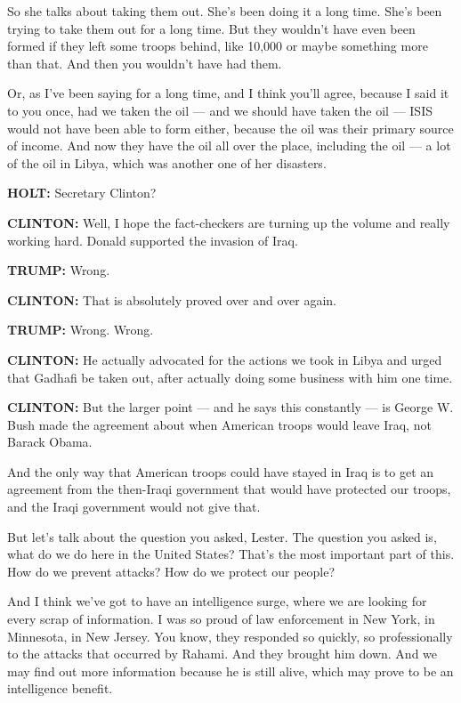 So she talks about taking them out. She's been doing it a long time.
She's been trying to take them out for a long time. But they wouldn't
have even been formed if they left some troops behind, like 10,000 or
maybe something more than that. And then you wouldn't have had them.

Or, as I've been saying for a long time, and I think you'll agree,
because I said it to you once, had we taken the oil --- and we should
have taken the oil --- ISIS would not have been able to form either,
because the oil was their primary source of income. And now they have
the oil all over the place, including the oil --- a lot of the oil in
Libya, which was another one of her disasters.

\textbf{HOLT:} Secretary Clinton?

\textbf{CLINTON:} Well, I hope the fact-checkers are turning up the
volume and really working hard. Donald supported the invasion of Iraq.

\textbf{TRUMP:} Wrong.

\textbf{CLINTON:} That is absolutely proved over and over again.

\textbf{TRUMP:} Wrong. Wrong.

\textbf{CLINTON:} He actually advocated for the actions we took in Libya
and urged that Gadhafi be taken out, after actually doing some business
with him one time.

\textbf{CLINTON:} But the larger point --- and he says this constantly
--- is George W. Bush made the agreement about when American troops
would leave Iraq, not Barack Obama.

And the only way that American troops could have stayed in Iraq is to
get an agreement from the then-Iraqi government that would have
protected our troops, and the Iraqi government would not give that.

But let's talk about the question you asked, Lester. The question you
asked is, what do we do here in the United States? That's the most
important part of this. How do we prevent attacks? How do we protect our
people?

And I think we've got to have an intelligence surge, where we are
looking for every scrap of information. I was so proud of law
enforcement in New York, in Minnesota, in New Jersey. You know, they
responded so quickly, so professionally to the attacks that occurred by
Rahami. And they brought him down. And we may find out more information
because he is still alive, which may prove to be an intelligence
benefit.

